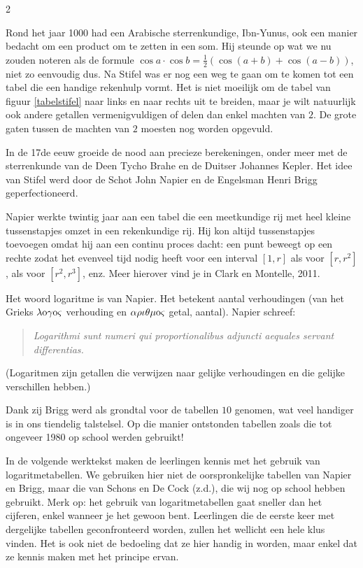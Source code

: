 \begin{multicols}{2}
 
Rond het jaar 1000 had een Arabische sterrenkundige, Ibn-Yunus, ook een manier bedacht om een product om te zetten in een som. Hij steunde op wat we nu zouden noteren als de formule $\cos a\cdot \cos b=\frac {1}{2} \left( \cos(a+b)+\cos(a-b) \right)$, niet zo eenvoudig dus.
Na Stifel was er nog een weg te gaan om te komen tot een tabel die een handige rekenhulp vormt. Het is niet moeilijk om de tabel van figuur \ref{tabelstifel} naar links en naar rechts uit te breiden, maar je wilt natuurlijk ook andere getallen vermenigvuldigen of delen dan enkel machten van $2$. De grote gaten tussen de machten van $2$ moesten nog worden opgevuld.

In de 17de eeuw groeide de nood aan precieze berekeningen, onder meer met de sterrenkunde van de Deen Tycho Brahe en de Duitser Johannes Kepler. Het idee van Stifel werd door de Schot John Napier en de Engelsman Henri Brigg geperfectioneerd.

Napier werkte twintig jaar aan een tabel die een meetkundige rij met heel kleine tussenstapjes omzet in een rekenkundige rij. Hij kon altijd tussenstapjes toevoegen omdat hij aan een continu proces dacht: een punt beweegt op een rechte zodat het evenveel tijd nodig heeft voor een interval $[1, r]$ als voor $[r, r^2]$, als voor $[r^2,r^3]$, enz. Meer hierover vind je in Clark en Montelle, 2011.

Het woord logaritme is van Napier. Het betekent aantal verhoudingen (van het Grieks $\lambda\rm o\gamma\rm o\varsigma$ verhouding en $\alpha\rho\iota\theta\mu\rm o \varsigma$ getal, aantal). Napier schreef:
\begin{quote}
\emph{Logarithmi sunt numeri qui proportionalibus adjuncti aequales servant differentias.}
\end {quote}
(Logaritmen zijn getallen die verwijzen naar gelijke verhoudingen en die gelijke verschillen hebben.)

Dank zij Brigg werd als grondtal voor de tabellen $10$ genomen, wat veel handiger is in ons tiendelig talstelsel. Op die manier ontstonden tabellen zoals die tot ongeveer 1980 op school werden gebruikt!

In de volgende werktekst maken de leerlingen kennis met het gebruik van logaritmetabellen. We gebruiken hier niet de oorspronkelijke tabellen van Napier en Brigg, maar die van Schons en De Cock (z.d.), die wij nog op school hebben gebruikt. Merk op: het gebruik van logaritmetabellen gaat sneller dan het cijferen, enkel wanneer je het gewoon bent. Leerlingen die de eerste keer met dergelijke tabellen geconfronteerd worden, zullen het wellicht een hele klus vinden. Het is ook niet de bedoeling dat ze hier handig in worden, maar enkel dat ze kennis maken met het principe ervan.

\end{multicols}




